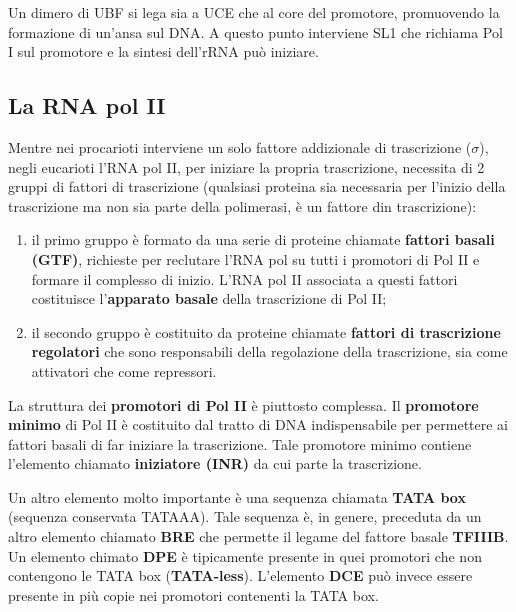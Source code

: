 \documentclass[11pt]{book}
\begin{document}
Un dimero di UBF si lega sia a UCE che al core del promotore,
promuovendo la formazione di un'ansa sul DNA. A questo punto interviene
SL1 che richiama Pol I sul promotore e la sintesi dell'rRNA può
iniziare.

\subsection{La RNA pol II}\label{la-rna-pol-ii}

Mentre nei procarioti interviene un solo fattore addizionale di
trascrizione (\(\sigma\)), negli eucarioti l'RNA pol II, per iniziare la
propria trascrizione, necessita di 2 gruppi di fattori di trascrizione
(qualsiasi proteina sia necessaria per l'inizio della trascrizione ma
non sia parte della polimerasi, è un fattore din trascrizione):

\begin{enumerate}
\def\labelenumi{\arabic{enumi}.}
\itemsep1pt\parskip0pt
\item
  il primo gruppo è formato da una serie di proteine chiamate
  \textbf{fattori basali (GTF)}, richieste per reclutare l'RNA pol su
  tutti i promotori di Pol II e formare il complesso di inizio. L'RNA
  pol II associata a questi fattori costituisce l'\textbf{apparato
  basale} della trascrizione di Pol II;
\item
  il secondo gruppo è costituito da proteine chiamate \textbf{fattori di
  trascrizione regolatori} che sono responsabili della regolazione della
  trascrizione, sia come attivatori che come repressori.
\end{enumerate}

La struttura dei \textbf{promotori di Pol II} è piuttosto complessa. Il
\textbf{promotore minimo} di Pol II è costituito dal tratto di DNA
indispensabile per permettere ai fattori basali di far iniziare la
trascrizione. Tale promotore minimo contiene l'elemento chiamato
\textbf{iniziatore (INR)} da cui parte la trascrizione.

Un altro elemento molto importante è una sequenza chiamata \textbf{TATA
box} (sequenza conservata TATAAA). Tale sequenza è, in genere, preceduta
da un altro elemento chiamato \textbf{BRE} che permette il legame del
fattore basale \textbf{TFIIIB}. Un elemento chimato \textbf{DPE} è
tipicamente presente in quei promotori che non contengono le TATA box
(\textbf{TATA-less}). L'elemento \textbf{DCE} può invece essere presente in
più copie nei promotori contenenti la TATA box.
\end{document}
